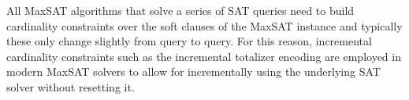 All MaxSAT algorithms that solve a series of SAT queries need to build cardinality constraints over the soft clauses of the MaxSAT instance and typically these only change slightly from query to query.
For this reason, incremental cardinality constraints such as the incremental totalizer encoding are employed in modern MaxSAT solvers to allow for incrementally using the underlying SAT solver without resetting it.